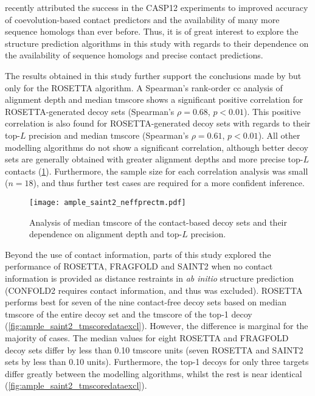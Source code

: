 \textcite{Abriata2018-lu} recently attributed the success in the CASP12 experiments to improved accuracy of coevolution-based contact predictors and the availability of many more sequence homologs than ever before. Thus, it is of great interest to explore the structure prediction algorithms in this study with regards to their dependence on the availability of sequence homologs and precise contact predictions.

The results obtained in this study further support the conclusions made by \textcite{Abriata2018-lu} but only for the ROSETTA algorithm. A Spearman's rank-order \gls{cc} analysis of alignment depth and median \gls{tmscore} shows a significant positive correlation for ROSETTA-generated decoy sets (Spearman's $\rho=0.68$, $p<0.01$). This positive correlation is also found for ROSETTA-generated decoy sets with regards to their top-$L$ precision and median \gls{tmscore} (Spearman's $\rho=0.61$, $p<0.01$). All other modelling algorithms do not show a significant correlation, although better decoy sets are generally obtained with greater alignment depths and more precise top-$L$ contacts (\cref{fig:ample_saint2_neffprectm}). Furthermore, the sample size for each correlation analysis was small ($n=18$), and thus further test cases are required for a more confident inference.

\begin{figure}[H]
    \centering
    \texttt{[image: ample\_saint2\_neffprectm.pdf]}
    \caption[Analysis of alignment depth, precision and TM-scores]{Analysis of median \gls{tmscore} of the contact-based decoy sets and their dependence on  alignment depth and top-$L$ precision.}
    \label{fig:ample_saint2_neffprectm}
\end{figure}

Beyond the use of contact information, parts of this study explored the performance of ROSETTA, FRAGFOLD and SAINT2 when no contact information is provided as distance restraints in \textit{ab initio} structure prediction (CONFOLD2 requires contact information, and thus was excluded). ROSETTA performs best for seven of the nine contact-free decoy sets based on median \gls{tmscore} of the entire decoy set and the \gls{tmscore} of the top-1 decoy (\cref{fig:ample_saint2_tmscoredataexcl}). However, the difference is marginal for the majority of cases. The median values for eight ROSETTA and FRAGFOLD decoy sets differ by less than 0.10 \gls{tmscore} units (seven ROSETTA and SAINT2 sets by less than 0.10 units). Furthermore, the top-1 decoys for only three targets differ greatly between the modelling algorithms, whilst the rest is near identical (\cref{fig:ample_saint2_tmscoredataexcl}).

